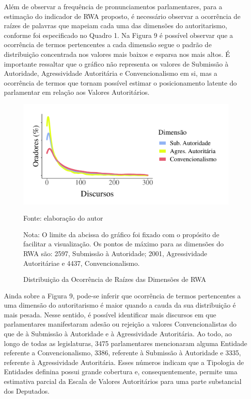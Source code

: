 \documentclass[
12pt,				%
openright,			%
twoside,			%
a4paper,			%
english,			%
french,				%
spanish,			%
brazil				%
]{abntex2}
\begin{document}
Além de observar a frequência de pronunciamentos parlamentares, para a estimação do indicador de RWA proposto, é necessário observar a ocorrência de raízes de palavras que mapeiam cada uma das dimensões do autoritarismo, conforme foi especificado no Quadro 1. Na Figura 9 é possível observar que a ocorrência de termos pertencentes a cada dimensão segue o padrão de distribuição concentrada nos valores mais baixos e esparsa nos mais altos. É importante ressaltar que o gráfico não representa os valores de Submissão à Autoridade, Agressividade Autoritária e Convencionalismo em si, mas a ocorrência de termos que tornam possível estimar o posicionamento latente do parlamentar em relação aos Valores Autoritários.

\begin{figure}[h]
	\caption{Distribuição da Ocorrência de Raízes das Dimensões de RWA}
	\label{fig:dens_ocorrencia_termos}
	\centering
	\includegraphics[width=.7\linewidth]{figures/dens_dimensoes_rwa}
	
	Fonte: elaboração do autor
	\begin{flushleft}
	Nota: O limite da abcissa do gráfico foi fixado com o propósito de facilitar a visualização. Os pontos de máximo para as dimensões do RWA são: 2597, Submissão à Autoridade; 2001, Agressividade Autoritáriae e 4437, Convencionalismo. 
	\end{flushleft} 	
\end{figure}

Ainda sobre a Figura 9, pode-se inferir que ocorrência de termos pertencentes a uma dimensão do autoritarismo é maior quando a cauda da sua distribuição é mais pesada. Nesse sentido, é possível identificar mais discursos em que parlamentares manifestaram adesão ou rejeição a valores Convencionalistas do que de à Submissão à Autoridade e à Agressividade Autoritária. Ao todo, ao longo de todas as legislaturas, 3475 parlamentares mencionaram alguma Entidade referente a Convencionalismo, 3386, referente à Submissão à Autoridade e 3335, referente à Agressividade Autoritária. Esses números indicam que a Tipologia de Entidades definina possui grande cobertura e, consequentemente, permite uma estimativa parcial da Escala de Valores Autoritários para uma parte substancial dos Deputados.
\end{document}

